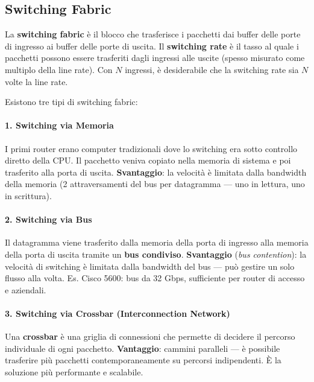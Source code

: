 
\subsection{Switching Fabric}

La \textbf{switching fabric} è il blocco che trasferisce i pacchetti dai buffer delle porte di ingresso ai buffer delle porte di uscita. Il \textbf{switching rate} è il tasso al quale i pacchetti possono essere trasferiti dagli ingressi alle uscite (spesso misurato come multiplo della line rate). Con $N$ ingressi, è desiderabile che la switching rate sia $N$ volte la line rate.

Esistono tre tipi di switching fabric:

\paragraph{1. Switching via Memoria}
I primi router erano computer tradizionali dove lo switching era sotto controllo diretto della CPU. Il pacchetto veniva copiato nella memoria di sistema e poi trasferito alla porta di uscita. \textbf{Svantaggio}: la velocità è limitata dalla bandwidth della memoria (2 attraversamenti del bus per datagramma — uno in lettura, uno in scrittura).


\paragraph{2. Switching via Bus}
Il datagramma viene trasferito dalla memoria della porta di ingresso alla memoria della porta di uscita tramite un \textbf{bus condiviso}. \textbf{Svantaggio} (\textit{bus contention}): la velocità di switching è limitata dalla bandwidth del bus — può gestire un solo flusso alla volta. Es. Cisco 5600: bus da 32 Gbps, sufficiente per router di accesso e aziendali.

\paragraph{3. Switching via Crossbar (Interconnection Network)}
Una \textbf{crossbar} è una griglia di connessioni che permette di decidere il percorso individuale di ogni pacchetto. \textbf{Vantaggio}: cammini paralleli — è possibile trasferire più pacchetti contemporaneamente su percorsi indipendenti. È la soluzione più performante e scalabile.

